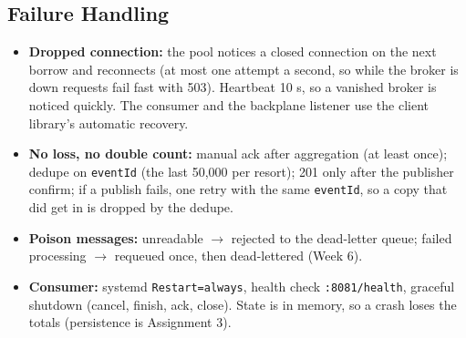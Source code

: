 \documentclass[10pt]{article}
\begin{document}
\subsection{Failure Handling}
\begin{itemize}
  \item \textbf{Dropped connection:} the pool notices a closed connection on the next borrow and reconnects (at most one attempt a second, so while the broker is down requests fail fast with 503). Heartbeat 10 s, so a vanished broker is noticed quickly. The consumer and the backplane listener use the client library's automatic recovery.
  \item \textbf{No loss, no double count:} manual ack after aggregation (at least once); dedupe on \texttt{eventId} (the last 50,000 per resort); 201 only after the publisher confirm; if a publish fails, one retry with the same \texttt{eventId}, so a copy that did get in is dropped by the dedupe.
  \item \textbf{Poison messages:} unreadable $\to$ rejected to the dead-letter queue; failed processing $\to$ requeued once, then dead-lettered (Week 6).
  \item \textbf{Consumer:} systemd \texttt{Restart=always}, health check \texttt{:8081/health}, graceful shutdown (cancel, finish, ack, close). State is in memory, so a crash loses the totals (persistence is Assignment 3).
\end{itemize}

\label{end-of-design}
\clearpage
\end{document}
